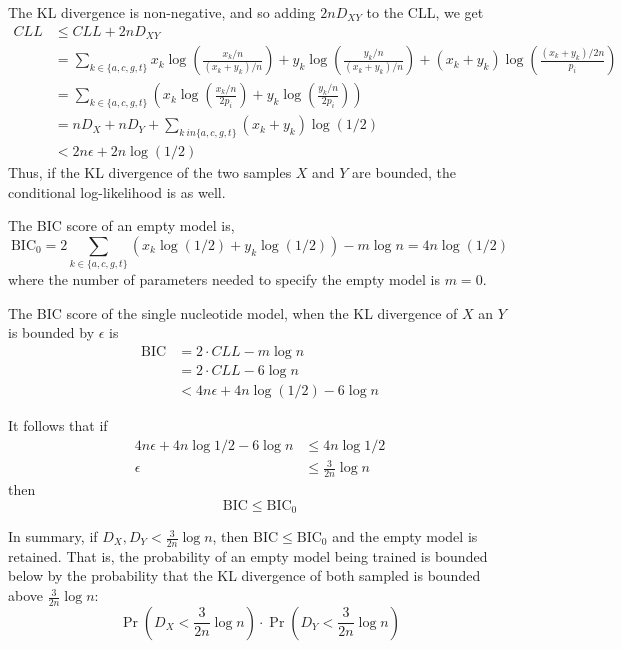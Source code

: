 \documentclass[letterpaper]{article}
\begin{document}
The KL divergence is non-negative, and so adding $2n D_{XY}$ to the CLL, we get
\begin{align*}
CLL &\le CLL + 2n D_{XY} \\
&=
\textstyle{
\sum_{k \in \{a, c, g, t\}} 
x_k \log \left( \frac{x_k/n}{(x_k + y_k)/n} \right)
+ y_k \log \left( \frac{y_k/n}{(x_k + y_k)/n} \right)
+ (x_k + y_k) \log \left( \frac{(x_k + y_k)/2n}{p_i} \right)} \\
&=
\textstyle{
\sum_{k \in \{a, c, g, t\}}
\left(
x_k \log \left( \frac{x_k/n}{2 p_i} \right) +
y_k \log \left( \frac{y_k/n}{2 p_i} \right)
\right)} \\
&=
\textstyle{
n D_{X} + n D_{Y} + \sum_{k \ in \{a, c, g, t\}} (x_k + y_k) \log (1/2)
} \\
&< 2n\epsilon + 2n \log (1/2)
\end{align*}
Thus, if the KL divergence of the two samples $X$ and $Y$ are bounded, the
conditional log-likelihood is as well.

The BIC score of an empty model is,
$$\text{BIC}_0 = 2 \sum_{k \in \{a, c, g, t\}}
\left(
x_k \log(1/2) + y_k \log(1/2) \right) - m
\log n = 4 n \log (1/2) $$
where the number of parameters needed to specify the empty model is $m = 0$.

The BIC score of the single nucleotide model, when the KL divergence of $X$ an
$Y$ is bounded by $\epsilon$ is
\begin{align*}
\text{BIC} &= 2 \cdot CLL - m \log n \\
&= 2 \cdot CLL - 6 \log n \\
&< 4n \epsilon + 4 n \log (1/2) - 6 \log n
\end{align*}

It follows that if
\begin{align*}
4n \epsilon + 4 n \log 1 / 2 - 6 \log n  &\le   4 n \log 1/2 \\
\epsilon &\le \frac{3}{2n} \log n
\end{align*}
then
$$ \text{BIC} \le \text{BIC}_0 $$

In summary, if $D_X, D_Y < \frac{3}{2n} \log n$, then $\text{BIC} \le
\text{BIC}_0$ and the empty model is retained. That is, the probability of an
empty model being trained is bounded below by the probability that the KL
divergence of both sampled is bounded above $\frac{3}{2n} \log n$:
$$ \Pr(D_{X} < \frac{3}{2n} \log n) \cdot 
\Pr(D_{Y} < \frac{3}{2n} \log n) $$
\end{document}
